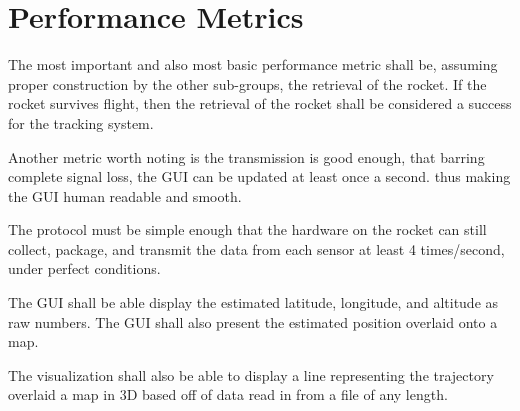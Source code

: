\documentclass[onecolumn, draftclsnofoot,10pt, compsoc]{IEEEtran}
\begin{document}
\section{Performance Metrics}
The most important and also most basic performance metric shall be, assuming proper construction by the other sub-groups, the retrieval of the rocket. If the rocket survives flight, then the retrieval of the rocket shall be considered a success for the tracking system. \par 
Another metric worth noting is the transmission is good enough, that barring complete signal loss, the GUI can be updated at least once a second. thus making the GUI human readable and smooth.\par
 The protocol must be simple enough that the hardware on the rocket can still collect, package, and transmit the data from each sensor at least 4 times/second, under perfect conditions. \par
The GUI shall be able display the estimated latitude, longitude, and altitude as raw numbers. The GUI shall also present the estimated position overlaid onto a map. \par
The visualization shall also be able to display a line representing the trajectory overlaid a map in 3D based off of data read in from a file of any length. \par
\end{document}
